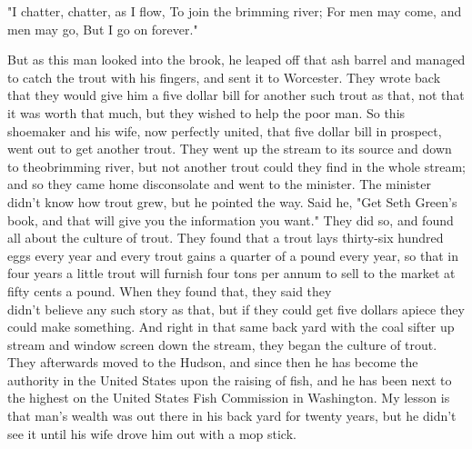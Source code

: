 \documentclass[10pt]{article}
\begin{document}
\begin{displayquote}
"I chatter, chatter, as I flow, To join the brimming river; For men may come, and men may go, But I go on forever."
\end{displayquote}

But as this man looked into the brook, he leaped off that ash barrel and managed to catch the trout with his fingers, and sent it to Worcester. They wrote back that they would give him a five dollar bill for another such trout as that, not that it was worth that much, but they wished to help the poor man. So this shoemaker and his wife, now perfectly united, that five dollar bill in prospect, went out to get another trout. They went up the stream to its source and down to theobrimming river, but not another trout could they find in the whole stream; and so they came home disconsolate and went to the minister. The minister didn't know how trout grew, but he pointed the way. Said he, "Get Seth Green's book, and that will give you the information you want." They did so, and found all about the culture of trout. They found that a trout lays thirty-six hundred eggs every year and every trout gains a quarter of a pound every year, so that in four years a little trout will furnish four tons per annum to sell to the market at fifty cents a pound. When they found that, they said they\\
didn't believe any such story as that, but if they could get five dollars apiece they could make something. And right in that same back yard with the coal sifter up stream and window screen down the stream, they began the culture of trout. They afterwards moved to the Hudson, and since then he has become the authority in the United States upon the raising of fish, and he has been next to the highest on the United States Fish Commission in Washington. My lesson is that man's wealth was out there in his back yard for twenty years, but he didn't see it until his wife drove him out with a mop stick.
\end{document}
